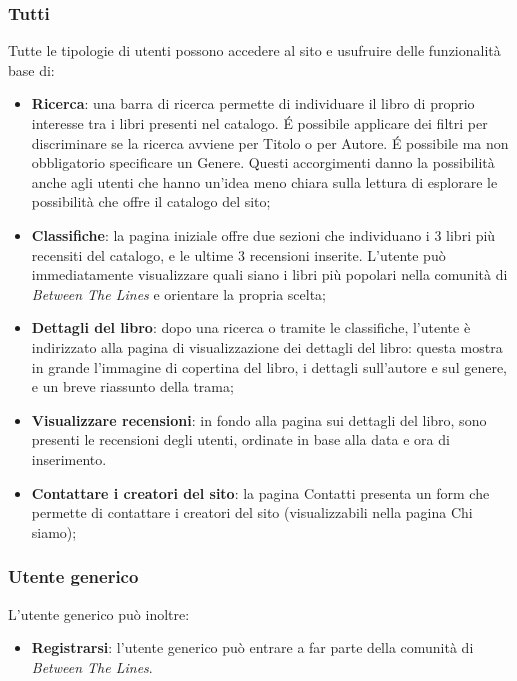 \documentclass[12pt,a4paper,headings=optiontohead]{article}
\begin{document}
	\subsubsection{Tutti}
	Tutte le tipologie di utenti possono accedere al sito e usufruire delle funzionalità base di:
	\begin{itemize}
		\item \textbf{Ricerca}: una barra di ricerca permette di individuare il libro di proprio interesse tra i libri presenti nel catalogo. \'E possibile applicare dei filtri per discriminare se la ricerca avviene per Titolo o per Autore. \'E possibile ma non obbligatorio specificare un Genere. Questi accorgimenti danno la possibilità anche agli utenti che hanno un'idea meno chiara sulla lettura di esplorare le possibilità che offre il catalogo del sito;
		\item \textbf{Classifiche}: la pagina iniziale offre due sezioni che individuano i 3 libri più recensiti del catalogo, e le ultime 3 recensioni inserite. L'utente può immediatamente visualizzare quali siano i libri più popolari nella comunità di \textit{Between The Lines} e orientare la propria scelta;
		\item \textbf{Dettagli del libro}: dopo una ricerca o tramite le classifiche, l'utente è indirizzato alla pagina di visualizzazione dei dettagli del libro: questa mostra in grande l'immagine di copertina del libro, i dettagli sull'autore e sul genere, e un breve riassunto della trama;
		\item \textbf{Visualizzare recensioni}: in fondo alla pagina sui dettagli del libro, sono presenti le recensioni degli utenti, ordinate in base alla data e ora di inserimento.
		\item \textbf{Contattare i creatori del sito}: la pagina Contatti presenta un form che permette di contattare i creatori del sito (visualizzabili nella pagina Chi siamo);
	\end{itemize}
	
	\subsubsection{Utente generico}
	
	L'utente generico può inoltre:
	\begin{itemize}
		\item \textbf{Registrarsi}: l'utente generico può entrare a far parte della comunità di \textit{Between The Lines}.
	\end{itemize}
	
\end{document}
